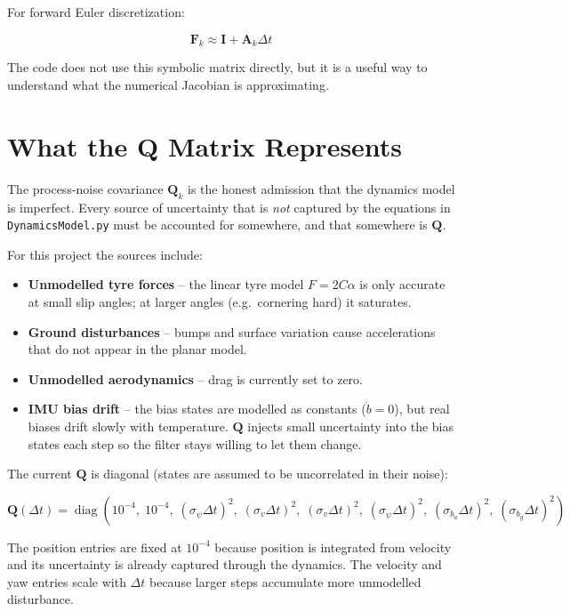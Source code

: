 \documentclass[11pt]{article}
\newcommand{\mat}[1]{\mathbf{#1}}
\newcommand{\diag}{\operatorname{diag}}
\begin{document}
For forward Euler discretization:

\begin{equation}
\mat{F}_k \approx \mat{I} + \mat{A}_k \Delta t
\end{equation}

The code does not use this symbolic matrix directly, but it is a useful way to understand what the numerical Jacobian is approximating.

\section{What the Q Matrix Represents}

The process-noise covariance $\mat{Q}_k$ is the honest admission that the
dynamics model is imperfect.  Every source of uncertainty that is \emph{not}
captured by the equations in \texttt{DynamicsModel.py} must be accounted for
somewhere, and that somewhere is $\mat{Q}$.

For this project the sources include:
\begin{itemize}
    \item \textbf{Unmodelled tyre forces} -- the linear tyre model
          $F = 2C\alpha$ is only accurate at small slip angles; at larger
          angles (e.g.\ cornering hard) it saturates.
    \item \textbf{Ground disturbances} -- bumps and surface variation cause
          accelerations that do not appear in the planar model.
    \item \textbf{Unmodelled aerodynamics} -- drag is currently set to zero.
    \item \textbf{IMU bias drift} -- the bias states are modelled as constants
          ($\dot{b} = 0$), but real biases drift slowly with temperature.
          $\mat{Q}$ injects small uncertainty into the bias states each step
          so the filter stays willing to let them change.
\end{itemize}

The current $\mat{Q}$ is diagonal (states are assumed to be uncorrelated in
their noise):

\begin{equation}
\mat{Q}(\Delta t) =
\diag(
10^{-4},\;
10^{-4},\;
(\sigma_{\dot\psi}\Delta t)^2,\;
(\sigma_v\Delta t)^2,\;
(\sigma_v\Delta t)^2,\;
(\sigma_{\dot\psi}\Delta t)^2,\;
(\sigma_{b_a}\Delta t)^2,\;
(\sigma_{b_g}\Delta t)^2)
\end{equation}

The position entries are fixed at $10^{-4}$ because position is integrated from
velocity and its uncertainty is already captured through the dynamics.  The
velocity and yaw entries scale with $\Delta t$ because larger steps accumulate
more unmodelled disturbance.
\end{document}
